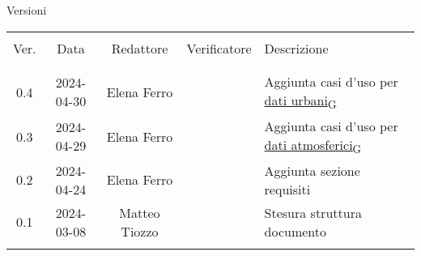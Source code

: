 \documentclass[12pt]{article}
\begin{document}


\newpage



\captionsetup[table]{list=no}
\begin{table}[!h]
	\footnotesize
	\begin{center}
		Versioni\\
		\vspace{0.5cm}
		\begin{tabular}{ c c c c p{6.1cm} }
			\hline                                                                                                                                                                                                   \\[-2ex]
			Ver. & Data       & Redattore     & Verificatore & Descrizione                                                                                                                                           \\
			\\[-2ex] \hline \\[-1.5ex]
			0.4  & 2024-04-30 & Elena Ferro   &              & Aggiunta casi d'uso per \href{https://7last.github.io/docs/rtb/documentazione-interna/glossario\#dati-urbani}{dati urbani\textsubscript{G}}           \\
			0.3  & 2024-04-29 & Elena Ferro   &              & Aggiunta casi d'uso per \href{https://7last.github.io/docs/rtb/documentazione-interna/glossario\#dati-atmosferici}{dati atmosferici\textsubscript{G}} \\
			0.2  & 2024-04-24 & Elena Ferro   &              & Aggiunta sezione requisiti                                                                                                                            \\
			0.1  & 2024-03-08 & Matteo Tiozzo &              & Stesura struttura documento                                                                                                                           \\
			\\[-1.5ex] \hline
		\end{tabular}
	\end{center}
\end{table}
\captionsetup[table]{list=yes}

\newpage

\tableofcontents
\listoftables

\newpage








\end{document}

